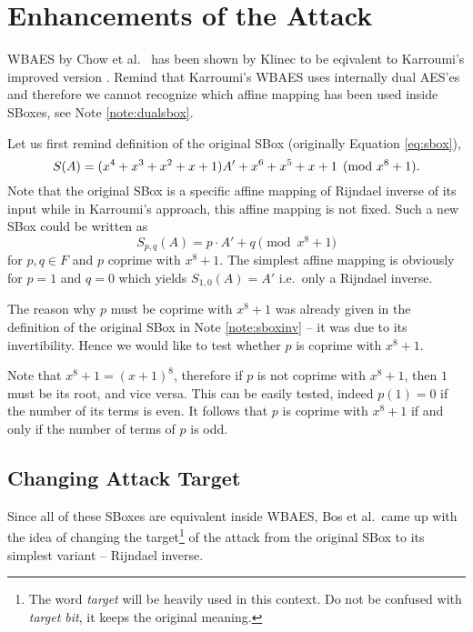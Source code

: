 \section{Enhancements of the Attack}   %

WBAES by Chow et al.\ \cite{chow2003aes} has been shown by Klinec \cite{klinec2013white} to be eqivalent to Karroumi's improved version \cite{karroumi2011protecting}. Remind that Karroumi's WBAES uses internally dual AES'es and therefore we cannot recognize which affine mapping has been used inside SBoxes, see Note \ref{note:dualsbox}.

Let us first remind definition of the original SBox (originally Equation \ref{eq:sbox}),
\[
	S(A) = (x^4 + x^3 + x^2 + x + 1)A' + x^6 + x^5 + x + 1 \pmod{x^8+1} .
\]
Note that the original SBox is a specific affine mapping of Rijndael inverse of its input while in Karroumi's approach, this affine mapping is not fixed. Such a new SBox could be written as
\begin{equation}
\label{eq:spq}
	S_{p,q}(A) = p\cdot A' + q \pmod{x^8+1}
\end{equation}
for $p,q\in F$ and $p$ coprime with $x^8+1$. The simplest affine mapping is obviously for $p=1$ and $q=0$ which yields $S_{1,0}(A) = A'$ i.e.\ only a Rijndael inverse.

\begin{remark}
\label{rem:coprime}
	The reason why $p$ must be coprime with $x^8+1$ was already given in the definition of the original SBox in Note \ref{note:sboxinv} -- it was due to its invertibility. Hence we would like to test whether $p$ is coprime with $x^8+1$.
	
	Note that $x^8+1 = (x+1)^8$, therefore if $p$ is not coprime with $x^8+1$, then $1$ must be its root, and vice versa. This can be easily tested, indeed $p(1) = 0$ if the number of its terms is even. It follows that $p$ is coprime with $x^8+1$ if and only if the number of terms of $p$ is odd.
\end{remark}



\subsection{Changing Attack Target}

Since all of these SBoxes are equivalent inside WBAES, Bos et al.\ came up with the idea of changing the target\footnote{The word {\em target} will be heavily used in this context. Do not be confused with {\em target bit}, it keeps the original meaning.} of the attack from the original SBox to its simplest variant -- Rijndael inverse.

